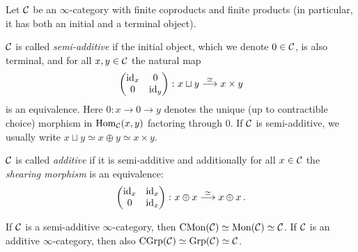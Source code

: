 \begin{defi}\label{def:Additive}
	Let $\mathcal{C}$ be an $\infty$-category  with finite coproducts and finite products (in particular, it has both an initial and a terminal object).
	\begin{alphanumerate}
		\item $\mathcal{C}$ is called \emph{semi-additive} if the initial object, which we denote $0\in\mathcal{C}$, is also terminal, and for all $x,y\in \mathcal{C}$ the natural map\label{enum:SemiAdditive}
		\begin{equation*}
			\begin{pmatrix}
				\operatorname{id}_x & 0\\
				0 & \operatorname{id}_y
			\end{pmatrix}\colon x\sqcup y\overset{\simeq}{\longrightarrow} x\times y
		\end{equation*}
		is an equivalence. Here $0\colon x\rightarrow 0\rightarrow y$ denotes the unique (up to contractible choice) morphism in $\operatorname{Hom}_{\mathcal{C}}(x,y)$ factoring through $0$. If $\mathcal{C}$ is semi-additive, we usually write $x\sqcup y\simeq x\oplus y\simeq x\times y$.
		\item $\mathcal{C}$ is called \emph{additive} if it is semi-additive and additionally for all $x\in \mathcal{C}$ the \emph{shearing morphism} is an equivalence:\label{enum:Additive}
		\begin{equation*}
			\begin{pmatrix}
				\operatorname{id}_x & \operatorname{id}_x\\
				0 & \operatorname{id}_x
			\end{pmatrix}\colon x\oplus x\overset{\simeq}{\longrightarrow} x\oplus x\,.
		\end{equation*}	
	\end{alphanumerate}
\end{defi}
\begin{lem}\label{lem:CGrpIsC}
	If $\mathcal{C}$ is a semi-additive $\infty$-category, then $\mathrm{CMon}(\mathcal{C})\simeq \mathrm{Mon}(\mathcal{C})\simeq \mathcal{C}$. If $\mathcal{C}$ is an additive $\infty$-category, then also $\mathrm{CGrp}(\mathcal{C})\simeq \mathrm{Grp}(\mathcal{C})\simeq \mathcal{C}$.
\end{lem}
